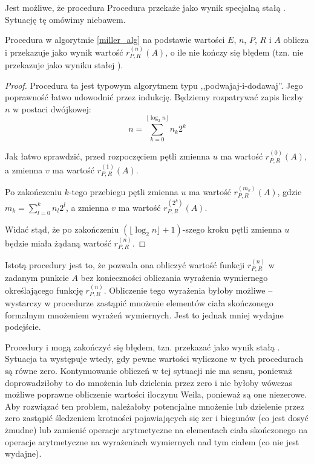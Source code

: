 \begin{remark}
Jest możliwe, że procedura Procedura 
przekaże jako wynik specjalną stałą .
Sytuację tę omówimy niebawem.
\end{remark}

\begin{lemma}\label{compute_value_correct_lemma}
Procedura  w algorytmie \ref{miller_alg}
na podstawie wartości
$E$, $n$, $P$, $R$ i $A$
oblicza i przekazuje jako wynik
wartość $r_{P,R}^{(n)}(A)$,
o ile nie kończy się błędem
(tzn. nie przekazuje jako wyniku stałej ).
\end{lemma}

\begin{proof}
Procedura ta jest typowym algorytmem typu ,,podwajaj-i-dodawaj''.
Jego poprawność łatwo udowodnić przez indukcję.
Będziemy rozpatrywać zapis liczby $n$ w postaci dwójkowej:
\begin{equation*}
n = \sum_{k = 0}^{\lfloor\log_2 n\rfloor} n_k2^k
\end{equation*}

\noindent
Jak łatwo sprawdzić,
przed rozpoczęciem pętli 
zmienna $u$ ma wartość $r_{P,R}^{(0)}(A)$,
a zmienna $v$ ma wartość $r_{P,R}^{(1)}(A)$.

\noindent
Po zakończeniu $k$-tego przebiegu pętli
zmienna $u$ ma wartość $r_{P,R}^{(m_k)}(A)$,
gdzie $m_k = \sum_{l=0}^k n_l2^l$,
a zmienna $v$ ma wartość $r_{P,R}^{(2^k)}(A)$.

\noindent
Widać stąd, że po zakończeniu $(\lfloor\log_2 n\rfloor+1)$-szego kroku pętli
zmienna $u$ będzie miała żądaną wartość $r_{P,R}^{(n)}$.
\end{proof}

\begin{remark}
Istotą procedury  jest to,
że pozwala ona obliczyć wartość funkcji $r_{P,R}^{(n)}$ w zadanym punkcie $A$
bez konieczności obliczania wyrażenia wymiernego
określającego funkcję $r_{P,R}^{(n)}$.
Obliczenie tego wyrażenia byłoby możliwe --
wystarczy w procedurze 
zastąpić mnożenie elementów ciała skończonego
formalnym mnożeniem wyrażeń wymiernych.
Jest to jednak mniej wydajne podejście.
\end{remark}

\begin{remark}\label{return_error_case_remark}
Procedury  i 
mogą zakończyć się błędem, tzn. przekazać jako wynik stałą .
Sytuacja ta występuje wtedy,
gdy pewne wartości wyliczone w tych procedurach są równe zero.
Kontynuowanie obliczeń w tej sytuacji nie ma sensu,
ponieważ doprowadziłoby to do mnożenia lub dzielenia przez zero
i nie byłoby wówczas możliwe poprawne obliczenie wartości iloczynu Weila,
ponieważ są one niezerowe.
Aby rozwiązać ten problem,
należałoby potencjalne mnożenie lub dzielenie przez zero
zastąpić śledzeniem krotności pojawiających się zer i biegunów
(co jest dosyć żmudne)
lub zamienić operacje arytmetyczne na elementach ciała skończonego
na operacje arytmetyczne na wyrażeniach wymiernych nad tym ciałem
(co nie jest wydajne).
\end{remark}

